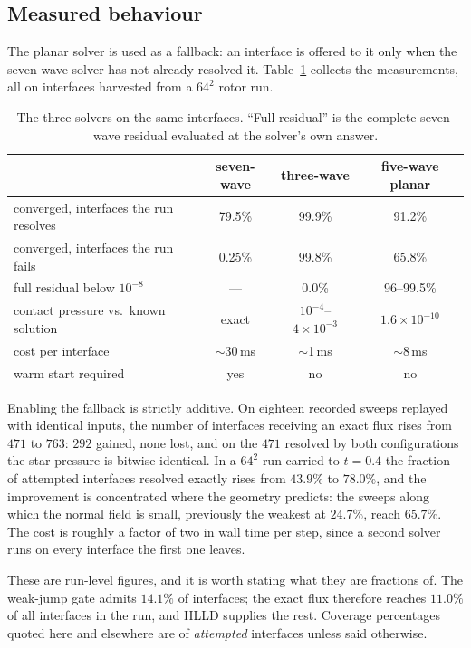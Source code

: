 \subsection{Measured behaviour}
\label{sec:planar:results}

The planar solver is used as a fallback: an interface is offered to it only
when the seven-wave solver has not already resolved it. Table~\ref{tab:planar}
collects the measurements, all on interfaces harvested from a $64^2$ rotor
run.

\begin{table}
\centering
\caption{The three solvers on the same interfaces. ``Full residual'' is the
complete seven-wave residual evaluated at the solver's own answer.}
\label{tab:planar}
\begin{tabular}{lccc}
\hline
 & seven-wave & three-wave & five-wave planar \\
\hline
converged, interfaces the run resolves & 79.5\% & 99.9\% & 91.2\% \\
converged, interfaces the run fails    & 0.25\% & 99.8\% & 65.8\% \\
full residual below $10^{-8}$          & ---    & 0.0\%  & 96--99.5\% \\
contact pressure vs.\ known solution   & exact  & $10^{-4}$--$4\times10^{-3}$ & $1.6\times10^{-10}$ \\
cost per interface                     & $\sim$30\,ms & $\sim$1\,ms & $\sim$8\,ms \\
warm start required                    & yes    & no     & no \\
\hline
\end{tabular}
\end{table}

Enabling the fallback is strictly additive. On eighteen recorded sweeps
replayed with identical inputs, the number of interfaces receiving an exact
flux rises from $471$ to $763$: $292$ gained, none lost, and on the $471$
resolved by both configurations the star pressure is bitwise identical. In a
$64^2$ run carried to $t = 0.4$ the fraction of attempted interfaces resolved
exactly rises from $43.9\%$ to $78.0\%$, and the improvement is concentrated
where the geometry predicts: the sweeps along which the normal field is
small, previously the weakest at $24.7\%$, reach $65.7\%$. The cost is
roughly a factor of two in wall time per step, since a second solver runs on
every interface the first one leaves.

These are run-level figures, and it is worth stating what they are fractions
of. The weak-jump gate admits $14.1\%$ of interfaces; the exact flux
therefore reaches $11.0\%$ of all interfaces in the run, and HLLD supplies
the rest. Coverage percentages quoted here and elsewhere are of
\emph{attempted} interfaces unless said otherwise.

